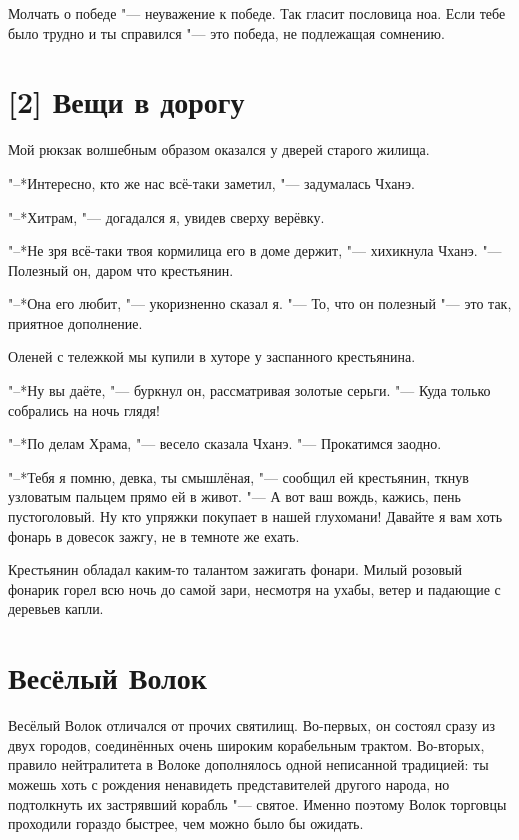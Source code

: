 Молчать о победе "--- неуважение к победе. 
Так гласит пословица ноа.
Если тебе было трудно и ты справился "--- это победа, не подлежащая сомнению.

\section{[2] Вещи в дорогу}

Мой рюкзак волшебным образом оказался у дверей старого жилища.

"--*Интересно, кто же нас всё-таки заметил, "--- задумалась Чханэ.

"--*Хитрам, "--- догадался я, увидев сверху верёвку.

"--*Не зря всё-таки твоя кормилица его в доме держит, "--- хихикнула Чханэ.
"--- Полезный он, даром что крестьянин.

"--*Она его любит, "--- укоризненно сказал я.
"--- То, что он полезный "--- это так, приятное дополнение.

\razd

Оленей с тележкой мы купили в хуторе у заспанного крестьянина.

"--*Ну вы даёте, "--- буркнул он, рассматривая золотые серьги.
"--- Куда только собрались на ночь глядя!

"--*По делам Храма, "--- весело сказала Чханэ.
"--- Прокатимся заодно.

"--*Тебя я помню, девка, ты смышлёная, "--- сообщил ей крестьянин, ткнув узловатым пальцем прямо ей в живот.
"--- А вот ваш вождь, кажись, пень пустоголовый.
Ну кто упряжки покупает в нашей глухомани!
Давайте я вам хоть фонарь в довесок зажгу, не в темноте же ехать.

Крестьянин обладал каким-то талантом зажигать фонари.
Милый розовый фонарик горел всю ночь до самой зари, несмотря на ухабы, ветер и падающие с деревьев капли.

\section{Весёлый Волок}

Весёлый Волок отличался от прочих святилищ.
Во-первых, он состоял сразу из двух городов, соединённых очень широким корабельным трактом.
Во-вторых, правило нейтралитета в Волоке дополнялось одной неписанной традицией: ты можешь хоть с рождения ненавидеть представителей другого народа, но подтолкнуть их застрявший корабль "--- святое.
Именно поэтому Волок торговцы проходили гораздо быстрее, чем можно было бы ожидать.

